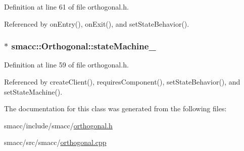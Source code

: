 Definition at line 61 of file orthogonal.\+h.



Referenced by on\+Entry(), on\+Exit(), and set\+State\+Behavior().

\subsubsection[{\texorpdfstring{state\+Machine\+\_\+}{stateMachine_}}]{$\ast$ smacc\+::\+Orthogonal\+::state\+Machine\+\_\+\hspace{0.3cm}{\ttfamily [private]}}\hypertarget{classsmacc_1_1Orthogonal_acea2058ac94667e46fc60ed3d4f524f7}{}\label{classsmacc_1_1Orthogonal_acea2058ac94667e46fc60ed3d4f524f7}


Definition at line 59 of file orthogonal.\+h.



Referenced by create\+Client(), requires\+Component(), set\+State\+Behavior(), and set\+State\+Machine().



The documentation for this class was generated from the following files\+:\begin{DoxyCompactItemize}
\item 
smacc/include/smacc/\hyperlink{orthogonal_8h}{orthogonal.\+h}\item 
smacc/src/smacc/\hyperlink{orthogonal_8cpp}{orthogonal.\+cpp}\end{DoxyCompactItemize}
